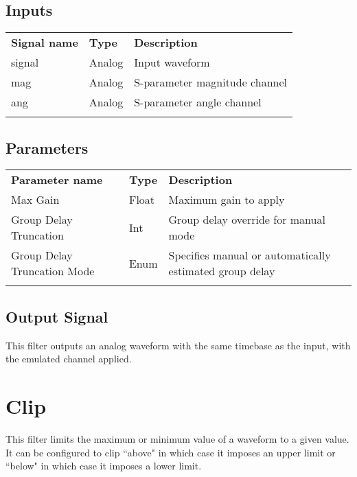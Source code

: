 \subsection{Inputs}

\begin{tabularx}{16cm}{llX}
\thickhline
\textbf{Signal name} & \textbf{Type} & \textbf{Description} \\
\thickhline
signal & Analog & Input waveform \\
\thinhline
mag & Analog & S-parameter magnitude channel \\
\thinhline
ang & Analog & S-parameter angle channel \\
\thickhline
\end{tabularx}

\subsection{Parameters}

\begin{tabularx}{16cm}{llX}
\thickhline
\textbf{Parameter name} & \textbf{Type} & \textbf{Description} \\
\thickhline
Max Gain & Float & Maximum gain to apply\\
\thinhline
Group Delay Truncation & Int & Group delay override for manual mode\\
\thinhline
Group Delay Truncation Mode & Enum & Specifies manual or automatically estimated group delay\\
\thickhline
\end{tabularx}

\subsection{Output Signal}

This filter outputs an analog waveform with the same timebase as the input, with the emulated channel applied.

\pagebreak
\section{Clip}
\label{filter:clip}

This filter limits the maximum or minimum value of a waveform to a given value. It can be configured
to clip ``above" in which case it imposes an upper limit or ``below" in which case it imposes a lower
limit.

